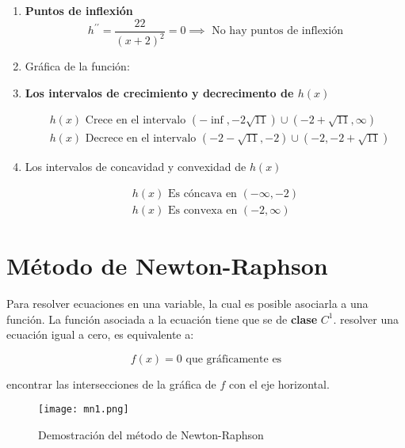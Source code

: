\begin{example}
\begin{enumerate}
		\item \textbf{Puntos de inflexión}
		      \begin{equation*}
			      h^{\prime\prime}=\frac{22}{\left(x+2\right)^2}=0\implies \text{ No hay puntos de inflexión}
		      \end{equation*}

		\item Gráfica de la función:%

		\item \textbf{Los intervalos de crecimiento y decrecimento de $h(x)$}

		      \begin{align*}
			       & h(x) \text{ Crece en el intervalo } (-\inf, -2\sqrt{11})\cup (-2+\sqrt{11},\infty) \\
			       & h(x) \text{ Decrece en el intervalo } (-2-\sqrt{11}, -2)\cup (-2,-2+\sqrt{11})
		      \end{align*}

		\item Los intervalos de concavidad y convexidad de $h(x)$

		      \begin{align*}
			      h(x) \text{ Es cóncava en } (-\infty, -2) \\
			      h(x) \text{ Es convexa en } (-2,\infty)
		      \end{align*}
	\end{enumerate}
\end{example}

\section{Método de Newton-Raphson}

Para resolver ecuaciones en una variable, la cual es posible asociarla a una función.
La función asociada a la ecuación tiene que se de \textbf{clase} $C^{1}$.
resolver una ecuación igual a cero, es equivalente a:

\begin{equation*}
	f(x)=0 \text{ que gráficamente es}
\end{equation*}

encontrar las intersecciones de la gráfica de $f$ con el eje horizontal.

\begin{figure}[h!]
	\centerline{\texttt{[image: mn1.png]}}
	\caption{Demostración del método de Newton-Raphson}
	\label{mn1}
\end{figure}

